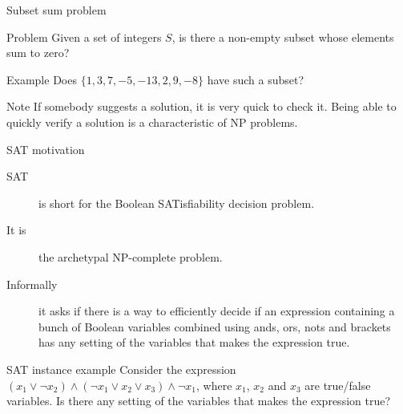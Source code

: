 \begin{frame}{Subset sum problem}
  
  \begin{alertblock}{Problem}
    Given a set of integers $S$, is there a non-empty subset whose elements sum to zero?
  \end{alertblock}

  \vspace{4mm}
  
  \begin{exampleblock}{Example}
    Does $\{ 1, 3, 7, -5, -13, 2, 9, -8 \}$ have such a subset?
  \end{exampleblock}
  
  \vspace{4mm}

  \begin{alertblock}{Note}
     If somebody suggests a solution, it is very quick to check it.
    Being able to quickly verify a solution is a characteristic of NP problems.
  \end{alertblock}
\end{frame}


\begin{frame}{SAT motivation}
  \begin{description}
    \item[SAT] is short for the Boolean SATisfiability decision problem.
    \item[It is] the archetypal NP-complete problem.
    \item[Informally] it asks if there is a way to efficiently decide if an expression containing a bunch of Boolean variables combined using ands, ors, nots and brackets has any setting of the variables that makes the expression true.
  \end{description}

  \begin{exampleblock}{SAT instance example}
    Consider the expression $(x_1 \lor \neg{x_2}) \land (\neg{x_1} \lor x_2 \lor x_3) \land \neg{x_1}$, where $x_1$, $x_2$ and $x_3$ are true/false variables.
    Is there any setting of the variables that makes the expression true?
  \end{exampleblock}
\end{frame}



